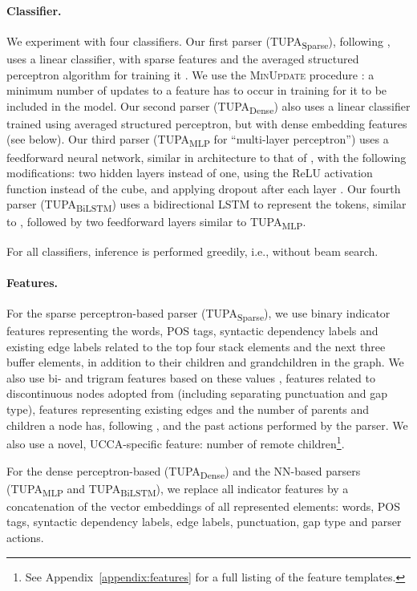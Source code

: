 \documentclass[11pt,a4paper]{article}
\newcommand{\parser}[1]{TUPA\textsubscript{#1}}
\begin{document}
\paragraph{Classifier.}
We experiment with four classifiers.
Our first parser (\parser{Sparse}), following \citet{maier-lichte:2016:DiscoNLP},
uses a linear classifier, with sparse features and
the averaged structured perceptron algorithm for training it
\cite{Coll:04}. We use the \textsc{MinUpdate} procedure \cite{goldberg2011learning}:
a minimum number of updates to a feature has to occur in training for it
to be included in the model.
Our second parser (\parser{Dense}) also uses a linear classifier
trained using averaged structured perceptron, but with dense embedding features (see below).
Our third parser (\parser{MLP} for ``multi-layer perceptron'') uses a feedforward neural network,
similar in architecture to that of \citet{chen2014fast}, with the following modifications:
two hidden layers instead of one, using the ReLU activation function instead of the cube,
and applying dropout after each layer \cite{srivastava2014dropout}.
Our fourth parser (\parser{BiLSTM}) uses a bidirectional LSTM to represent the tokens,
similar to \cite{kiperwasser2016simple}, followed by two feedforward layers similar to \parser{MLP}.

For all classifiers, inference is performed greedily, i.e., without beam search.

\paragraph{Features.}
For the sparse perceptron-based parser (\parser{Sparse}),
we use binary indicator features representing
the words, POS tags, syntactic dependency labels and
existing edge labels related to the top four stack elements and the 
next three buffer elements, in addition to their children and grandchildren in the graph.
We also use bi- and trigram features based on these values \cite{zhang2009transition,zhu2013fast},
features related to discontinuous nodes adopted from \citet{maier2015discontinuous}
(including separating punctuation and gap type),
features representing existing edges and the number of parents and children a node has, following \citet{tokgoz2015transition},
and the past actions performed by the parser.
We also use a novel, UCCA-specific feature:
number of remote children\footnote{See
Appendix~\ref{appendix:features} for a full listing of the feature templates.}.

For the dense perceptron-based (\parser{Dense}) and the NN-based parsers
(\parser{MLP} and \parser{BiLSTM}),
we replace all indicator features by a
concatenation of the vector embeddings of all represented elements:
words, POS tags, syntactic dependency labels, edge labels, punctuation, gap type and parser actions.
\end{document}
